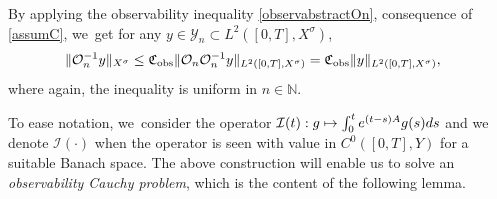 \documentclass[10pt]{amsart}
\newcommand\mto{\mathchoice{\longmapsto}{\mapsto}{\mapsto}{\mapsto}}
\theoremstyle{definition}
\let\mc\mathcal
\renewcommand{\O}{\mc{O}}
\newcommand{\Y}{\mc{Y}}
\newcommand{\N}{\mathbb{N}}
\providecommand{\norm}[1]{\lVert#1\rVert}
\begin{document}
By applying the observability inequality \eqref{observabstractOn}, consequence of \cref{assumC}, we~get for any $y\in \Y_n \subset L^2([0, T], X^\sigma)$,
\begin{align}
\label{boundOn-1}
\norm{\O_n^{-1}y}_{X^\sigma}&\leq \mathfrak{C}_{\textup{obs}}\norm{\O_{n}\O_n^{-1}y}_{L^2([0, T], X^\sigma)}=\mathfrak{C}_{\textup{obs}}\norm{y}_{L^2([0, T], X^\sigma)},
\end{align}
where again, the inequality is uniform in $n\in \N$.

To ease notation, we~consider the operator $\mc{I}(t): g\mto \int_0^t e^{(t-s)A}g(s)ds$ and we denote $\mc{I}(\cdot)$ when the operator is seen with value in $C^{0}([0,T],Y)$ for a suitable Banach space. The above construction will enable us to solve an \emph{observability Cauchy problem}, which is the content of the following lemma.
\end{document}
